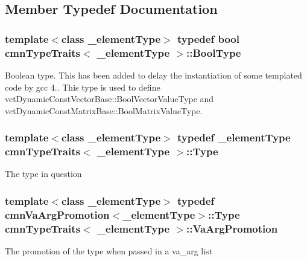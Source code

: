 \subsection{Member Typedef Documentation}
\hypertarget{classcmn_type_traits_aaa41087228a7f165bcd9f4385e644e28}{
\subsubsection[{Bool\-Type}]{\setlength{\rightskip}{0pt plus 5cm}template$<$class \-\_\-element\-Type$>$ typedef bool {\bf cmn\-Type\-Traits}$<$ \-\_\-element\-Type $>$\-::{\bf Bool\-Type}}}\label{classcmn_type_traits_aaa41087228a7f165bcd9f4385e644e28}
Boolean type. This has been added to delay the instantiation of some templated code by gcc 4.. This type is used to define vct\-Dynamic\-Const\-Vector\-Base\-::\-Bool\-Vector\-Value\-Type and vct\-Dynamic\-Const\-Matrix\-Base\-::\-Bool\-Matrix\-Value\-Type. \hypertarget{classcmn_type_traits_aefe66f235207b010b396b5558529a1da}{
\subsubsection[{Type}]{\setlength{\rightskip}{0pt plus 5cm}template$<$class \-\_\-element\-Type$>$ typedef \-\_\-element\-Type {\bf cmn\-Type\-Traits}$<$ \-\_\-element\-Type $>$\-::{\bf Type}}}\label{classcmn_type_traits_aefe66f235207b010b396b5558529a1da}
The type in question \hypertarget{classcmn_type_traits_a824cf785b2d249f59bf5d9f03c6e8049}{
\subsubsection[{Va\-Arg\-Promotion}]{\setlength{\rightskip}{0pt plus 5cm}template$<$class \-\_\-element\-Type$>$ typedef {\bf cmn\-Va\-Arg\-Promotion}$<$\-\_\-element\-Type$>$\-::{\bf Type} {\bf cmn\-Type\-Traits}$<$ \-\_\-element\-Type $>$\-::{\bf Va\-Arg\-Promotion}}}\label{classcmn_type_traits_a824cf785b2d249f59bf5d9f03c6e8049}
The promotion of the type when passed in a va\-\_\-arg list 

